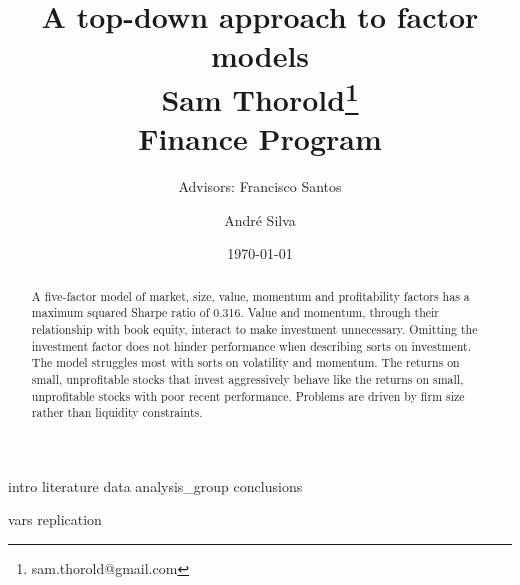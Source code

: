 \documentclass[a4paper, 12pt]{article}
\title{
  {A top-down approach to factor models}\\[1cm]
  {\Large Sam Thorold\thanks{sam.thorold@gmail.com}}\\
  {\large Finance Program}\\
}
\author[1]{Advisors: Francisco Santos}
\affil[1]{Norwegian School of Economics}
\author[2]{Andr\'e Silva}
\affil[2]{NOVA School of Business and Economics}
\date{\today}
\begin{document}
\maketitle


\begin{abstract}
  A five-factor model of
  market, size, value, momentum and profitability factors
  has a maximum squared Sharpe ratio of 0.316.
  Value and momentum, through their relationship with book equity,
  interact to make investment unnecessary.
  Omitting the investment factor does not hinder performance when describing
  sorts on investment.
  The model struggles most with sorts on volatility and momentum.
  The returns on small, unprofitable stocks that invest aggressively behave
  like the returns on small, unprofitable stocks with poor recent performance.
  Problems are driven by firm size rather than liquidity constraints.
\end{abstract}


{intro}
{literature}
{data}
{analysis_group}
{conclusions}


\printbibliography

\appendix
{vars}
{replication}
\end{document}
